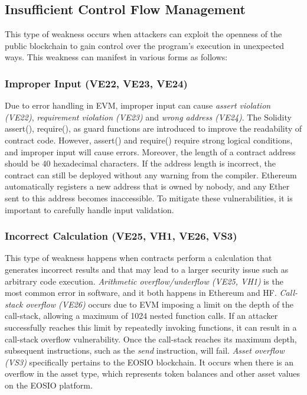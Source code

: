 \documentclass[manuscript,screen]{acmart}
\begin{document}
\subsection{Insufficient Control Flow Management}
This type of weakness occurs when attackers can exploit the openness of the public blockchain to gain control over the program's execution in unexpected ways. This weakness can manifest in various forms as follows:

\subsubsection{Improper Input (VE22, VE23, VE24)} Due to error handling in EVM, improper input can cause \textit{assert violation (VE22)}, \textit{requirement violation (VE23)} and \textit{wrong address (VE24)}. The Solidity assert(), require(), as guard functions are introduced to improve the readability of contract code. However, assert() and require() require strong logical conditions, and improper input will cause errors. Moreover, the length of a contract address should be 40 hexadecimal characters. If the address length is incorrect, the contract can still be deployed without any warning from the compiler. Ethereum automatically registers a new address that is owned by nobody, and any Ether sent to this address becomes inaccessible. To mitigate these vulnerabilities, it is important to carefully handle input validation. 

\subsubsection{Incorrect Calculation (VE25, VH1, VE26, VS3)} This type of weakness happens when contracts perform a calculation that generates incorrect results and that may lead to a larger security issue such as arbitrary code execution. \textit{Arithmetic overflow/underflow (VE25, VH1)} is the most common error in software, and it both happens in Ethereum and HF. \textit{Call-stack overflow (VE26)} occurs due to EVM imposing a limit on the depth of the call-stack, allowing a maximum of 1024 nested function calls. If an attacker successfully reaches this limit by repeatedly invoking functions, it can result in a call-stack overflow vulnerability. Once the call-stack reaches its maximum depth, subsequent instructions, such as the \textit{send} instruction, will fail. \textit{Asset overflow (VS3)} specifically pertains to the EOSIO blockchain. It occurs when there is an overflow in the asset type, which represents token balances and other asset values on the EOSIO platform.
\end{document}
